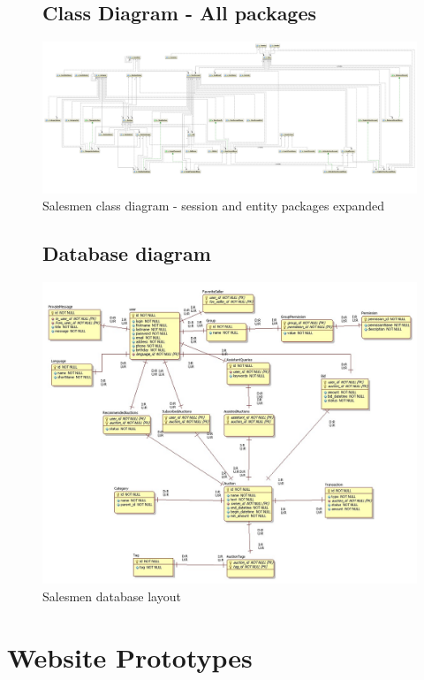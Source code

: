 \documentclass[salesmen, twoside]{../../../templates/latex/2009/softproj}
\begin{document}
\begin{projdoc}
\begin{figure}
\section{Class Diagram - All packages}
\label{fig_class3}
\includegraphics[scale=0.20,angle=90]{../../img/salesmen_class_all.png}
\caption{Salesmen class diagram - session and entity packages expanded}
\end{figure}

\clearpage
\begin{figure}
\section{Database diagram}
\label{fig_database}
\includegraphics[scale=0.44,angle=90]{../../img/erd1.jpg}
\caption{Salesmen database layout}
\end{figure}

\chapter{Website Prototypes}
\begin{figure}

\end{figure}
\end{projdoc}
\end{document}
